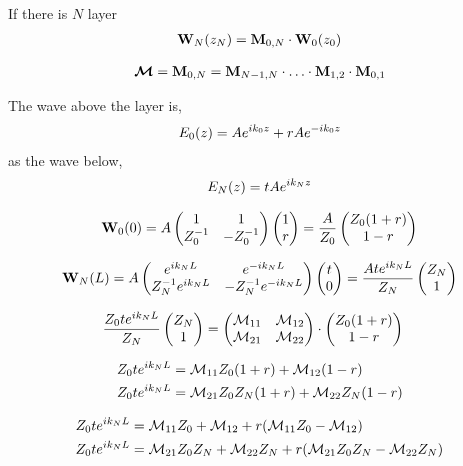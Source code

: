 If there is $N$ layer
\begin{align*}
	\vb{W}_{N}\pqty{z_{N}} = \vb{M}_{0,N} \cdot \vb{W}_{0}\pqty{z_{0}}
\end{align*}

\begin{align*}
	\boldsymbol{\mathcal{M}} = \vb{M}_{0,N} = \vb{M}_{N-1,N}\cdot\ldots\cdot\vb{M}_{1,2}\cdot\vb{M}_{0,1}
\end{align*}

The wave above the layer is,
\begin{align*}
	E_0\pqty{z} = Ae^{ik_0z} + rAe^{-ik_0z}
\end{align*} as the wave below,
\begin{align*}
	E_N\pqty{z} = tAe^{ik_Nz}
\end{align*}

\begin{align*}
	\vb{W}_0\pqty{0} = A\pmqty{1 & 1 \\ Z_0^{-1} & -Z_0^{-1}}\pmqty{1 \\ r} = \frac{A}{Z_0} \pmqty{Z_0\pqty{1+r} \\ 1-r}
\end{align*}

\begin{align*}
	\vb{W}_N\pqty{L} = A\pmqty{e^{ik_N L} & e^{-ik_N L} \\ Z_N^{-1}e^{ik_N L} & -Z_N^{-1}e^{-ik_N L}}\pmqty{t \\ 0} = \frac{A t e^{ik_N L}}{Z_N} \pmqty{Z_N \\ 1}
\end{align*}

\begin{align*}
	\frac{Z_0 t e^{ik_N L}}{Z_N} \pmqty{Z_N \\ 1} &= \pmqty{\mathcal{M}_{11} & \mathcal{M}_{12} \\ \mathcal{M}_{21} & \mathcal{M}_{22}}\cdot  \pmqty{Z_0\pqty{1+r} \\ 1-r}
\end{align*}

\begin{align*}
	Z_0 t e^{ik_N L} &= \mathcal{M}_{11}Z_0\pqty{1+r} + \mathcal{M}_{12}\pqty{1-r} \\
	Z_0 t e^{ik_N L} &= \mathcal{M}_{21}Z_0Z_N\pqty{1+r} + \mathcal{M}_{22}Z_N\pqty{1-r}
\end{align*}

\begin{align*}
	Z_0 t e^{ik_N L} &= \mathcal{M}_{11}Z_0 + \mathcal{M}_{12} + r\pqty{\mathcal{M}_{11}Z_0 - \mathcal{M}_{12}} \\
	Z_0 t e^{ik_N L} &= \mathcal{M}_{21}Z_0Z_N + \mathcal{M}_{22}Z_N + r\pqty{\mathcal{M}_{21}Z_0Z_N - \mathcal{M}_{22}Z_N}
\end{align*}

